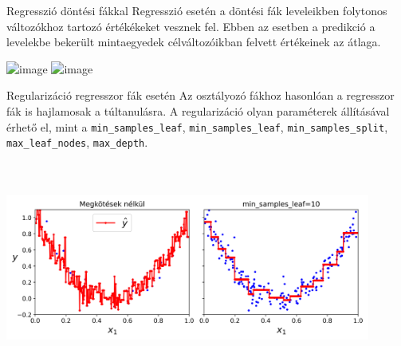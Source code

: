 \documentclass[english, aspectratio=169]{beamer}
\begin{document}
\begin{frame}{Regresszió döntési fákkal}
Regresszió esetén a döntési fák leveleikben folytonos változókhoz tartozó értékékeket vesznek fel. Ebben az esetben a predikció a levelekbe bekerült mintaegyedek célváltozóikban felvett értékeinek az átlaga. 
\begin{center}
\includegraphics<1>[width=12cm, height=7cm, keepaspectratio]{graphs/decision_trees_9.png}
\includegraphics<2>[width=12cm, height=7cm, keepaspectratio]{images/decision_trees_6.png}
\end{center}
\end{frame}

\begin{frame}{Regularizáció regresszor fák esetén}
Az osztályozó fákhoz hasonlóan a regresszor fák is hajlamosak a túltanulásra. A regularizáció olyan paraméterek állításával érhető el, mint a \texttt{min\_samples\_leaf}, \texttt{min\_samples\_leaf}, \texttt{min\_samples\_split}, \texttt{max\_leaf\_nodes}, \texttt{max\_depth}.
\begin{center}
\includegraphics[width=12cm, height=7cm, keepaspectratio]{images/decision_trees_7.png}
\end{center}
\end{frame}
\end{document}
